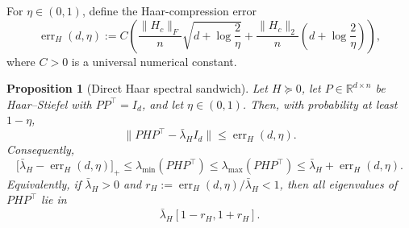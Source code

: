 \documentclass{article}
\newtheorem{proposition}{Proposition}
\begin{document}
For \(\eta\in(0,1)\), define the Haar-compression error
\begin{equation}
\operatorname{err}_H(d,\eta)
:=
C\left(
\frac{\|H_c\|_F}{n}\sqrt{d+\log\frac{2}{\eta}}
+
\frac{\|H_c\|_2}{n}\left(d+\log\frac{2}{\eta}\right)
\right),
\label{eq:haar_compression_error_app}
\end{equation}
where \(C>0\) is a universal numerical constant.



\begin{proposition}[Direct Haar spectral sandwich]
\label{prop:haar_spectral_sandwich}
Let \(H\succeq0\), let \(P\in\mathbb R^{d\times n}\) be Haar--Stiefel with
\(PP^\top=I_d\), and let \(\eta\in(0,1)\). Then, with probability at least
\(1-\eta\),
\begin{equation}
\bigl\|PHP^\top-\bar\lambda_H I_d\bigr\|
\le
\operatorname{err}_H(d,\eta).
\label{eq:haar_spectral_sandwich_norm}
\end{equation}
Consequently,
\begin{equation}
\bigl[\bar\lambda_H-\operatorname{err}_H(d,\eta)\bigr]_+
\le
\lambda_{\min}(PHP^\top)
\le
\lambda_{\max}(PHP^\top)
\le
\bar\lambda_H+\operatorname{err}_H(d,\eta).
\label{eq:haar_spectral_sandwich_eigs}
\end{equation}
Equivalently, if \(\bar\lambda_H>0\) and
\(r_H:=\operatorname{err}_H(d,\eta)/\bar\lambda_H<1\), then all eigenvalues of
\(PHP^\top\) lie in
\begin{equation}
\bar\lambda_H[1-r_H,1+r_H].
\label{eq:haar_spectral_sandwich_relative}
\end{equation}
\end{proposition}
\end{document}

